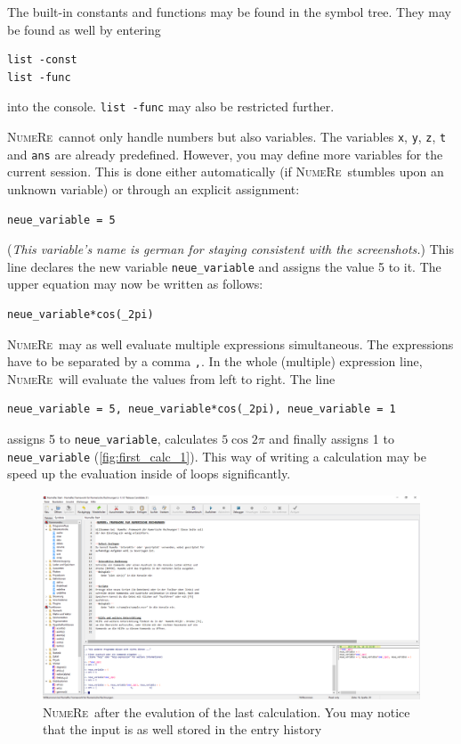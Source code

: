 \documentclass[DIV=14,headsepline,footsepline]{scrbook}
\newcommand{\NR}{\textsc{Nu\-me\-Re}}
\begin{document}
				The built-in constants and functions may be found in the symbol tree. They may be found as well by entering 
				\begin{lstlisting}
list -const
list -func
				\end{lstlisting}
				into the console. \lstinline+list -func+ may also be restricted further.
				
				\NR\ cannot only handle numbers but also variables. The variables \lstinline+x+, \lstinline+y+, \lstinline+z+, \lstinline+t+ and \lstinline+ans+ are already predefined. However, you may define more variables for the current session. This is done either automatically (if \NR\ stumbles upon an unknown variable) or through an explicit assignment:
				\begin{lstlisting}
neue_variable = 5
				\end{lstlisting}
				(\emph{This variable's name is german for staying consistent with the screenshots.}) This line declares the new variable \lstinline+neue_variable+ and assigns the value 5 to it. The upper equation may now be written as follows:
				\begin{lstlisting}
neue_variable*cos(_2pi)
				\end{lstlisting}
				
				\NR\ may as well evaluate multiple expressions simultaneous. The expressions have to be separated by a comma \lstinline+,+. In the whole (multiple) expression line, \NR\ will evaluate the values from left to right. The line
				\begin{lstlisting}
neue_variable = 5, neue_variable*cos(_2pi), neue_variable = 1
				\end{lstlisting}
				assigns 5 to \lstinline+neue_variable+, calculates $5\cos2\pi$ and finally assigns 1 to \lstinline+neue_variable+ (\autoref{fig:first_calc_1}). This way of writing a calculation may be speed up the evaluation inside of loops significantly.
				
				\begin{figure}[htb]%
					\centering
					\includegraphics[width=\textwidth]{_graphics/first_calc_1.png}
					\caption{\NR\ after the evalution of the last calculation. You may notice that the input is as well stored in the entry history}
					\label{fig:first_calc_1}
				\end{figure}
\end{document}
